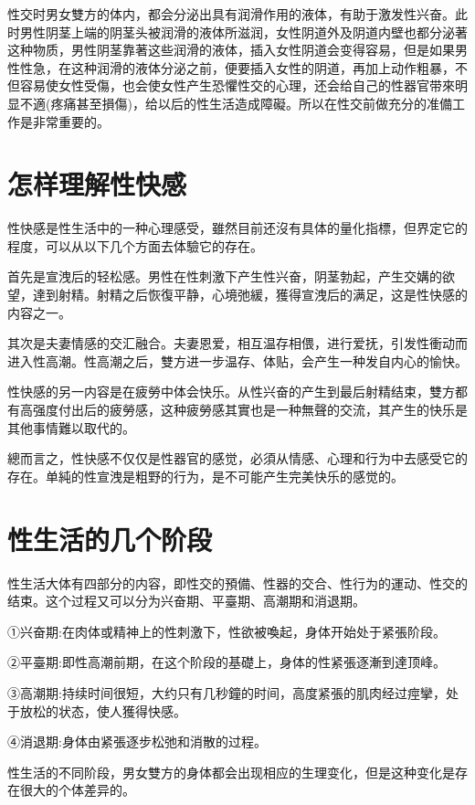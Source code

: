 \documentclass[12pt,UTF8]{ctexbook}
\begin{document}
性交时男女雙方的体内，都会分泌出具有润滑作用的液体，有助于激发性兴奋。此时男性阴茎上端的阴茎头被润滑的液体所滋润，女性阴道外及阴道内壁也都分泌著这种物质，男性阴茎靠著这些润滑的液体，插入女性阴道会变得容易，但是如果男性性急，在这种润滑的液体分泌之前，便要插入女性的阴道，再加上动作粗暴，不但容易使女性受傷，也会使女性产生恐懼性交的心理，还会给自己的性器官带來明显不適(疼痛甚至損傷)，给以后的性生活造成障礙。所以在性交前做充分的准備工作是非常重要的。

\section{怎样理解性快感}

性快感是性生活中的一种心理感受，雖然目前还沒有具体的量化指標，但界定它的程度，可以从以下几个方面去体驗它的存在。

首先是宣洩后的轻松感。男性在性刺激下产生性兴奋，阴茎勃起，产生交媾的欲望，達到射精。射精之后恢復平静，心境弛緩，獲得宣洩后的满足，这是性快感的内容之一。

其次是夫妻情感的交汇融合。夫妻恩爱，相互温存相偎，进行爱抚，引发性衝动而进入性高潮。性高潮之后，雙方进一步温存、体贴，会产生一种发自内心的愉快。

性快感的另一内容是在疲勞中体会快乐。从性兴奋的产生到最后射精结束，雙方都有高强度付出后的疲勞感，这种疲勞感其實也是一种無聲的交流，其产生的快乐是其他事情難以取代的。

總而言之，性快感不仅仅是性器官的感觉，必須从情感、心理和行为中去感受它的存在。单純的性宣洩是粗野的行为，是不可能产生完美快乐的感觉的。

\section{性生活的几个阶段}

性生活大体有四部分的内容，即性交的預備、性器的交合、性行为的運动、性交的结束。这个过程又可以分为兴奋期、平臺期、高潮期和消退期。

①兴奋期:在肉体或精神上的性刺激下，性欲被喚起，身体开始处于紧張阶段。

②平臺期:即性高潮前期，在这个阶段的基礎上，身体的性紧張逐漸到達顶峰。

③高潮期:持续时间很短，大约只有几秒鐘的时间，高度紧張的肌肉经过痙攣，处于放松的状态，使人獲得快感。

④消退期:身体由紧張逐步松弛和消散的过程。

性生活的不同阶段，男女雙方的身体都会出现相应的生理变化，但是这种变化是存在很大的个体差异的。
\end{document}
